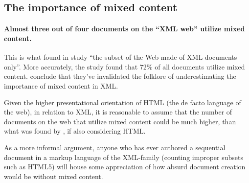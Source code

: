 \documentclass{scrreprt}
\begin{document}
\subsection{The importance of mixed content}
\paragraph{Almost three out of four documents on the ``XML web'' utilize mixed content.} This is what \citet{mignet} found in  study ``the subset of the Web made of XML documents only''. More accurately, the study found that 72\% of all documents utilize mixed content. \citet{mignet} conclude that they've invalidated the folklore of underestimating the importance of mixed content in XML.

Given the higher presentational orientation of HTML (the de facto language of the web), in relation to XML, it is reasonable to assume that the number of documents on the web that utilize mixed content could be much higher, than what was found by \citet{mignet}, if also considering HTML.

As a more informal argument, anyone who has ever authored a sequential document in a markup language of the XML-family (counting improper subsets such as HTML5) will house some appreciation of how absurd document creation would be without mixed content.





% 
\end{document}

